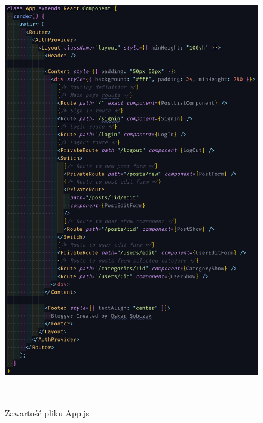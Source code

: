 \documentclass[declaration,shortabstract,polish,inz]{iithesis}
\begin{document}
\begin{figure}[H]
    \centering
    \includegraphics[height=19cm]{images/appjs2.png}
    \caption{Zawartość pliku  App.js}
    \label{fig:app.js}
\end{figure}
\end{document}
